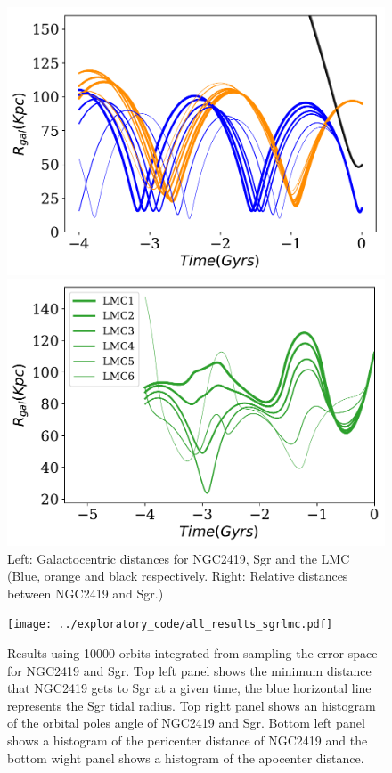 \documentclass[14pt]{article}
\begin{document}
\begin{figure}[H]
\centering
\begin{minipage}{0.49\linewidth}
\includegraphics[scale=0.5]{../exploratory_code/gal_orbits_all_LMCs.pdf}
\end{minipage}
\begin{minipage}{0.45\linewidth}
\includegraphics[scale=0.5]{../exploratory_code/d_rel_all_LMCs.pdf}
\end{minipage}
\caption{Left: Galactocentric distances for NGC2419, Sgr and the LMC (Blue,
orange and black respectively. Right: Relative distances between
NGC2419 and Sgr.)\label{fig:MWlSgrLMCs}}
\end{figure}


\begin{figure}[H]
\centering
\texttt{[image: ../exploratory\_code/all\_results\_sgrlmc.pdf]}
\caption{Results using 10000 orbits integrated from sampling the
error space for NGC2419 and Sgr. Top left panel shows the minimum
distance that NGC2419 gets to Sgr at a given time, the blue horizontal
line represents the Sgr tidal radius. Top right panel shows an
histogram of the orbital poles angle of NGC2419 and Sgr. Bottom left
panel shows a histogram of the pericenter distance of NGC2419 and
the bottom wight panel shows a histogram of the apocenter
distance.}
\end{figure}
\end{document}
